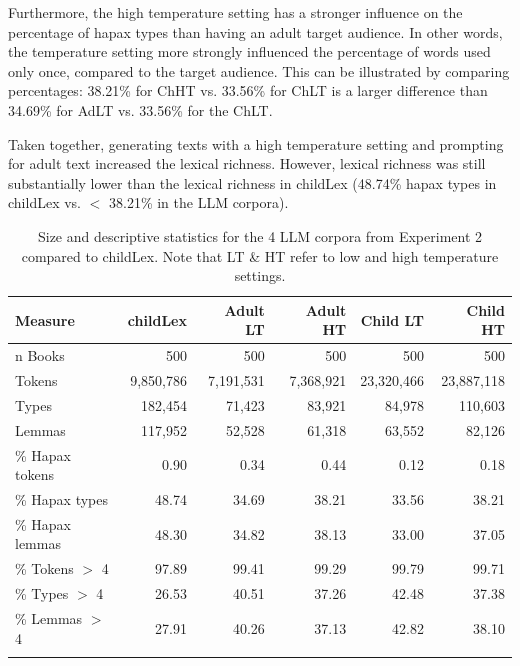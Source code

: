\documentclass[manuscript]{stjour}
\begin{document}
Furthermore, the high temperature setting has a stronger influence on the percentage of hapax types than having an adult target audience. In other words, the temperature setting more strongly influenced the percentage of words used only once, compared to the target audience. This can be illustrated by comparing percentages: 38.21\% for ChHT vs. 33.56\% for ChLT is a larger difference than 34.69\% for AdLT vs. 33.56\% for the ChLT. 

Taken together, generating texts with a high temperature setting and prompting for adult text increased the lexical richness. However, lexical richness was still substantially lower than the lexical richness in childLex (48.74\% hapax types in childLex vs. $<$ 38.21\% in the LLM corpora). 

\begin{table}[!htbp]
\caption{Size and descriptive statistics for the 4 LLM corpora from Experiment 2 compared to childLex. Note that LT \& HT refer to low and high temperature settings.}
\centering
\begin{tabular}{lrrrrr}
  \hline
    Measure & childLex & Adult LT & Adult HT & Child LT & Child HT \\ 
  \hline
n Books & 500 & 500 & 500 & 500 & 500 \\ 
  Tokens & 9,850,786 & 7,191,531 & 7,368,921 & 23,320,466 & 23,887,118 \\ 
  Types & 182,454 & 71,423 & 83,921 & 84,978 & 110,603 \\ 
  Lemmas & 117,952 & 52,528 & 61,318 & 63,552 & 82,126 \\ 
  \% Hapax tokens & 0.90 & 0.34 & 0.44 & 0.12 & 0.18 \\ 
  \% Hapax types & 48.74 & 34.69 & 38.21 & 33.56 & 38.21 \\ 
  \% Hapax lemmas & 48.30 & 34.82 & 38.13 & 33.00 & 37.05 \\ 
  \% Tokens $>$ 4 & 97.89 & 99.41 & 99.29 & 99.79 & 99.71 \\ 
  \% Types $>$ 4 & 26.53 & 40.51 & 37.26 & 42.48 & 37.38 \\ 
  \% Lemmas $>$ 4 & 27.91 & 40.26 & 37.13 & 42.82 & 38.10 \\ 
   \hline \\
\end{tabular}
\label{freqComp2}
\end{table}
\end{document}
